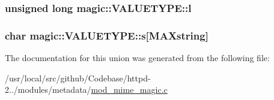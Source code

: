 \subsubsection[{\texorpdfstring{l}{l}}]{\setlength{\rightskip}{0pt plus 5cm}unsigned long magic\+::\+V\+A\+L\+U\+E\+T\+Y\+P\+E\+::l}\hypertarget{unionmagic_1_1VALUETYPE_a3adbff18dae0da97e74d7586f8c3662c}{}\label{unionmagic_1_1VALUETYPE_a3adbff18dae0da97e74d7586f8c3662c}
\subsubsection[{\texorpdfstring{s}{s}}]{\setlength{\rightskip}{0pt plus 5cm}char magic\+::\+V\+A\+L\+U\+E\+T\+Y\+P\+E\+::s\mbox{[}{\bf M\+A\+Xstring}\mbox{]}}\hypertarget{unionmagic_1_1VALUETYPE_a749edffc5d4364cb89939849f5b0dbac}{}\label{unionmagic_1_1VALUETYPE_a749edffc5d4364cb89939849f5b0dbac}


The documentation for this union was generated from the following file\+:\begin{DoxyCompactItemize}
\item 
/usr/local/src/github/\+Codebase/httpd-\/2../modules/metadata/\hyperlink{mod__mime__magic_8c}{mod\+\_\+mime\+\_\+magic.\+c}\end{DoxyCompactItemize}
